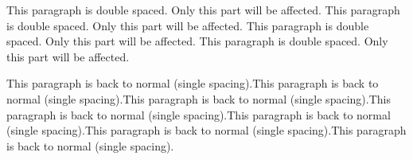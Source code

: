 \documentclass{article}
\begin{document}
\begin{spacing}{1}
	This paragraph is double spaced.
	Only this part will be affected.	This paragraph is double spaced.
	Only this part will be affected.	This paragraph is double spaced.
	Only this part will be affected.	This paragraph is double spaced.
	Only this part will be affected.
\end{spacing}

\begin{spacing}{3}


This paragraph is back to normal (single spacing).This paragraph is back to normal (single spacing).This paragraph is back to normal (single spacing).This paragraph is back to normal (single spacing).This paragraph is back to normal (single spacing).This paragraph is back to normal (single spacing).This paragraph is back to normal (single spacing).
\end{spacing}


	
\end{document}
